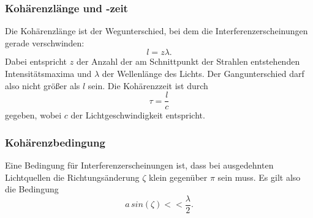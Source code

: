\subsubsection{Kohärenzlänge und -zeit}
Die Kohärenzlänge ist der Wegunterschied, bei dem die Interferenzerscheinungen
gerade verschwinden:
\begin{equation*}
    l = z \lambda.
\end{equation*}
Dabei entspricht $z$ der Anzahl der am Schnittpunkt der Strahlen entstehenden Intensitätsmaxima 
und $\lambda$ der Wellenlänge des Lichts. 
Der Gangunterschied darf also nicht größer als $l$ sein.
\newline
Die Kohärenzzeit ist durch
\begin{equation*}
    \tau = \frac{l}{c}
\end{equation*}
gegeben, wobei $c$ der Lichtgeschwindigkeit entspricht.


\subsubsection{Kohärenzbedingung} %
Eine Bedingung für Interferenzerscheinungen ist, dass bei ausgedehnten 
Lichtquellen die Richtungsänderung $\zeta$ 
klein gegenüber $\pi$ sein muss. Es gilt also die Bedingung 
\begin{equation*}
    a \, sin(\zeta) << \frac{\lambda}{2}.
\end{equation*}


